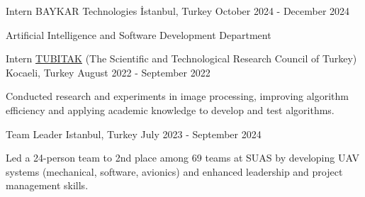 
\begin{cventries}


  \cventry
    {Intern} %
    {BAYKAR Technologies} %
    {İstanbul, Turkey} %
    {October 2024 - December 2024} %
    {
      \begin{cvitems} %
        \item {Artificial Intelligence and Software Development Department}
      \end{cvitems}
    }


  \cventry
    {Intern} %
    {\href{https://tubitak.gov.tr/tr}{\underline{TUBITAK}} (The Scientific and Technological Research Council of Turkey)} %
    {Kocaeli, Turkey} %
    {August 2022 - September 2022} %
    {
      \begin{cvitems} %
        \item {Conducted research and experiments in image processing, improving algorithm efficiency and applying academic knowledge to develop and test algorithms.}
      \end{cvitems}
    }

    \cventry
    {Team Leader} %
    {\href{https://itunomuav.itu.edu.tr/}{}} %
    {Istanbul, Turkey} %
    {July 2023 - September 2024} %
    {
      \begin{cvitems} %
        \item {Led a 24-person team to 2nd place among 69 teams at SUAS by developing UAV systems (mechanical, software, avionics) and enhanced leadership and project management skills.}
      \end{cvitems}
    }


\end{cventries}
